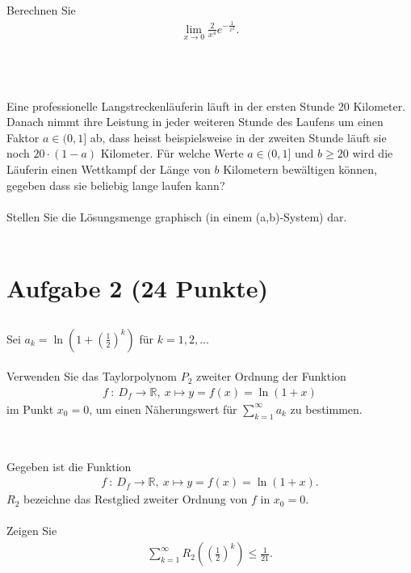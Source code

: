 \subsection*{}
Berechnen Sie 
\begin{align*}
\lim \limits_{x \to 0} \frac{2}{x^4} e^{- \frac{1}{x^2}}.
\end{align*}
\\
\\
\subsection*{}
Eine professionelle Langstreckenläuferin läuft in der ersten Stunde 20 Kilometer. Danach nimmt ihre Leistung in jeder weiteren Stunde des Laufens um einen Faktor $ a \in (0,1] $ ab, dass heisst beispielsweise in der zweiten Stunde läuft sie noch $ 20 \cdot (1-a) $ Kilometer.
Für welche Werte $ a \in (0,1] $ und $ b \geq 20  $ wird die Läuferin einen Wettkampf der Länge von $ b  $ Kilometern bewältigen können, gegeben dass sie beliebig lange laufen kann?
\\
\\
Stellen Sie die Lösungsmenge graphisch (in einem (a,b)-System) dar.
\\
\\
\newpage
\section*{Aufgabe 2 (24 Punkte)}
\vspace{0.4cm}
\subsection*{}
Sei $ a_k = \ln \left( 1 + \left( \frac{1}{2}\right)^k \right) $ für $ k = 1,2,... $\\
\\
Verwenden Sie das Taylorpolynom $ P_2 $ zweiter Ordnung der Funktion
\begin{align*}
f \ : \ D_f \to \mathbb{R}, \ x \mapsto y = f(x) = \ln(1+x)
\end{align*}
im Punkt $ x_0 = 0 $, um einen Näherungswert für 
$ \sum_{k=1}^\infty a_k $ zu bestimmen.
\\
\\
\subsection*{}
Gegeben ist die Funktion
\begin{align*}
f \ : \ D_f \to \mathbb{R}, \ x \mapsto y = f(x) = \ln(1+x).
\end{align*}
$ R_2 $ bezeichne das Restglied zweiter Ordnung von $ f  $ in $ x_0 = 0 $.\\
\\
Zeigen Sie
\begin{align*}
	\sum \limits_{k=1}^\infty R_2 \left( \left( \frac{1}{2}\right)^k \right) \leq \frac{1}{21}.
\end{align*}
\\
\\
